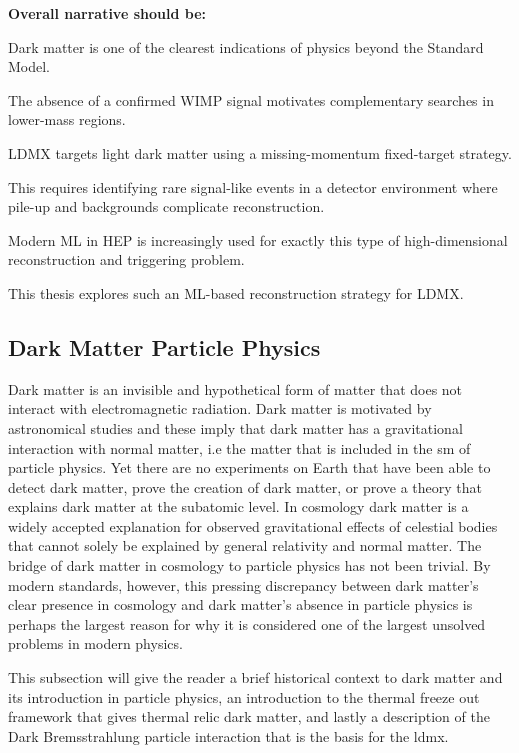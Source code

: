 \textbf{Overall narrative should be:}

Dark matter is one of the clearest indications of physics beyond the Standard Model.

The absence of a confirmed WIMP signal motivates complementary searches in lower-mass regions.

LDMX targets light dark matter using a missing-momentum fixed-target strategy.

This requires identifying rare signal-like events in a detector environment where pile-up and backgrounds complicate reconstruction.

Modern ML in HEP is increasingly used for exactly this type of high-dimensional reconstruction and triggering problem.

This thesis explores such an ML-based reconstruction strategy for LDMX.


\subsection{Dark Matter Particle Physics}
\label{sec:dm_particle_physics}


Dark matter is an invisible and hypothetical form of matter that does not interact with electromagnetic radiation. Dark matter is motivated by astronomical studies and these imply that dark matter has a gravitational interaction with normal matter, i.e the matter that is included in the \gls{sm} of particle physics. Yet there are no experiments on Earth that have been able to detect dark matter, prove the creation of dark matter, or prove a theory that explains dark matter at the subatomic level. In cosmology dark matter is a widely accepted explanation for observed gravitational effects of celestial bodies that cannot solely be explained by general relativity and normal matter. The bridge of dark matter in cosmology to particle physics has not been trivial. By modern standards, however, this pressing discrepancy between dark matter's clear presence in cosmology and dark matter's absence in particle physics is perhaps the largest reason for why it is considered one of the largest unsolved problems in modern physics. \cite{bertone2016-history-dark-matter} \cite{cirelli2026-darkmatter} 

This subsection will give the reader a brief historical context to dark matter and its introduction in particle physics, an introduction to the thermal freeze out framework that gives thermal relic dark matter, and lastly a description of the Dark Bremsstrahlung particle interaction that is the basis for the \gls{ldmx}.

